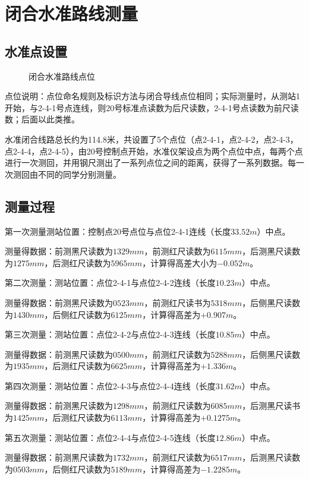 \documentclass[UTF8]{ctexart}
\begin{document}
\section{闭合水准路线测量}
	\subsection{水准点设置}
		\begin{figure}[H]
		\caption{闭合水准路线点位}
		\end{figure}
	点位说明：点位命名规则及标识方法与闭合导线点位相同；实际测量时，从测站1开始，与2-4-1号点连线，则20号标准点读数为后尺读数，2-4-1号点读数为前尺读数；后面以此类推。
	
	水准闭合线路总长约为114.8米，共设置了5个点位（点2-4-1，点2-4-2，点2-4-3，点2-4-4，点2-4-5），由20号控制点开始，水准仪架设点为两个点位中点，每两个点进行一次测回，并用钢尺测出了一系列点位之间的距离，获得了一系列数据。每一次测回由不同的同学分别测量。
	\subsection{测量过程}
	第一次测量测站位置：控制点20号点位与点位2-4-1连线（长度$ 33.52m $）中点。
	
	测量得数据：前测黑尺读数为$ 1329mm $，前测红尺读数为$ 6115mm $，后测黑尺读数为$ 1275mm $，后测红尺读数为$ 5965mm $，计算得高差大小为$ -0.052m $。
	
	第二次测量：测站位置：点位2-4-1与点位2-4-2连线（长度$ 10.23m $）中点。
	
	测量得数据：前测黑尺读数为$ 0523mm $，前测红尺读书为$ 5318mm $，后侧黑尺读数为$ 1430mm $，后侧红尺读数为$ 6125mm $，计算得高差为$ +0.907m $。
	
	第三次测量：测站位置：点位2-4-2与点位2-4-3连线（长度$ 10.85m $）中点。
	
	测量得数据：前测黑尺读数为$ 0500mm $，前测红尺读数为$ 5288mm $，后侧黑尺读数为$ 1935mm $，后测红尺读数为$ 6625mm $，计算得高差为$ +1.336m $。
	
	第四次测量：测站位置：点位2-4-3与点位2-4-4连线（长度$ 31.62m $）中点。
	
	测量得数据：前测黑尺读数为$ 1298mm $，前测红尺读数为$ 6085mm $，后测黑尺读书为$ 1425mm $，后测红尺读数为$ 6113mm $，计算得高差为$ +0.1275m $。
	
	第五次测量：测站位置：点位2-4-4与点位2-4-5连线（长度$ 12.86m $）中点。
	
	测量得数据：前测黑尺读数为$ 1732mm $，前测红尺读数为$ 6517mm $，后测黑尺读数为$ 0503mm $，后侧红尺读数为$ 5189mm $，计算得高差为$ -1.2285m $。
	
\end{document}
